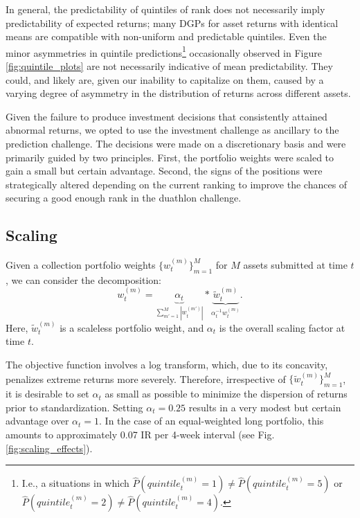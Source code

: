 \documentclass[3p,times,twocolumn]{elsarticle}
\begin{document}
In general, the predictability of quintiles of rank does not necessarily imply predictability of expected returns; many DGPs for asset returns with identical means are compatible with non-uniform and predictable quintiles. 
Even the minor asymmetries in quintile predictions\footnote{I.e., a situations in which $\hat{P}(quintile_{t}^{(m)}=1) \neq \hat{P}(quintile_{t}^{(m)}=5)$ or $\hat{P}(quintile_{t}^{(m)}=2) \neq \hat{P}(quintile_{t}^{(m)}=4)$.} occasionally observed in Figure \ref{fig:quintile_plots} are not necessarily indicative of mean predictability.
They could, and likely are, given our inability to capitalize on them, caused by a varying degree of asymmetry in the distribution of returns across different assets.

Given the failure to produce investment decisions that consistently attained abnormal returns, we opted to use the investment challenge as ancillary to the prediction challenge.
The decisions were made on a discretionary basis and were primarily guided by two principles.
First, the portfolio weights were scaled to gain a small but certain advantage.
Second, the signs of the positions were strategically altered depending on the current ranking to improve the chances of securing a good enough rank in the duathlon challenge.

\subsection{Scaling}\label{subsection:scaling}

Given a collection portfolio weights $\{w_{t}^{(m)}\}_{m=1}^{M}$ for $M$ assets submitted at time $t$, we can consider the decomposition:
\begin{equation}
    w_{t}^{(m)}=\underbrace{\alpha_{t}}_{\sum_{m'=1}^{M}|w_{t}^{(m')}|}  * \underbrace{\tilde{w}_{t}^{(m)}}_{ \alpha_{t}^{-1}w_{t}^{(m)} }.
\end{equation}
Here, $\tilde{w}_{t}^{(m)}$ is a scaleless portfolio weight, and $\alpha_{t}$ is the overall scaling factor at time $t$.

The objective function \citep[see][]{makridakisM6FinancialDuathlon2022} involves a log transform, which, due to its concavity, penalizes extreme returns more severely. 
Therefore, irrespective of $\{\tilde{w}_{t}^{(m)}\}_{m=1}^{M}$, it is desirable to set $\alpha_{t}$ as small as possible to minimize the dispersion of returns prior to standardization.
Setting $\alpha_{t}=0.25$ results in a very modest but certain advantage over $\alpha_{t}=1$. 
In the case of an equal-weighted long portfolio, this amounts to approximately 0.07 IR per 4-week interval (see Fig. \ref{fig:scaling_effects}).
\end{document}
